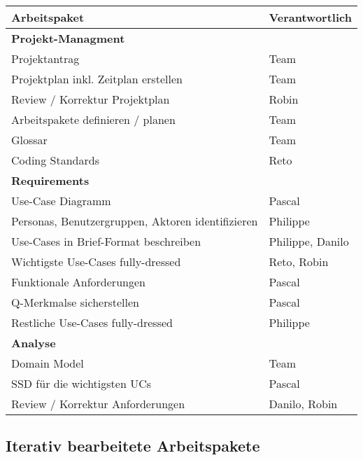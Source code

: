 \documentclass[a4paper,12pt,halfparskip,DIV14]{scrreprt}
\begin{document}
\begin{tabular}{@{} l l @{}}
\toprule
Arbeitspaket & Verantwortlich \\
\midrule
\textbf{Projekt-Managment} & \\
Projektantrag & Team \\
Projektplan inkl. Zeitplan erstellen & Team \\
Review / Korrektur Projektplan & Robin \\
Arbeitspakete definieren / planen & Team \\
Glossar & Team \\
Coding Standards & Reto \\
\midrule
\textbf{Requirements} &  \\
Use-Case Diagramm & Pascal \\
Personas, Benutzergruppen, Aktoren identifizieren & Philippe \\
Use-Cases in Brief-Format beschreiben & Philippe, Danilo \\
Wichtigste Use-Cases fully-dressed & Reto, Robin \\
Funktionale Anforderungen & Pascal \\
Q-Merkmalse sicherstellen & Pascal \\
Restliche Use-Cases fully-dressed & Philippe \\
\midrule
\textbf{Analyse} &  \\
Domain Model & Team \\
SSD für die wichtigsten UCs & Pascal \\
Review / Korrektur Anforderungen & Danilo, Robin \\
\bottomrule
\end{tabular}

\subsection{Iterativ bearbeitete Arbeitspakete}
\end{document}
